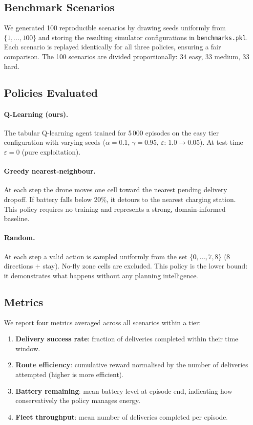 \documentclass[11pt,twocolumn]{article}
\begin{document}
\subsection{Benchmark Scenarios}

We generated 100 reproducible scenarios by drawing seeds uniformly from
$\{1, \ldots, 100\}$ and storing the resulting simulator configurations
in \texttt{benchmarks.pkl}.
Each scenario is replayed identically for all three policies, ensuring a
fair comparison.
The 100 scenarios are divided proportionally: 34 easy, 33 medium, 33
hard.

\subsection{Policies Evaluated}

\paragraph{Q-Learning (ours).}
The tabular Q-learning agent trained for 5\,000 episodes on the easy
tier configuration with varying seeds ($\alpha{=}0.1$,
$\gamma{=}0.95$, $\varepsilon$: $1.0 \to 0.05$).
At test time $\varepsilon = 0$ (pure exploitation).

\paragraph{Greedy nearest-neighbour.}
At each step the drone moves one cell toward the nearest pending
delivery dropoff.
If battery falls below 20\%, it detours to the nearest charging
station.
This policy requires no training and represents a strong,
domain-informed baseline.

\paragraph{Random.}
At each step a valid action is sampled uniformly from the set
$\{0,\ldots,7,8\}$ (8 directions $+$ stay).
No-fly zone cells are excluded.
This policy is the lower bound: it demonstrates what happens without
any planning intelligence.

\subsection{Metrics}

We report four metrics averaged across all scenarios within a tier:

\begin{enumerate}[leftmargin=*, nosep]
    \item \textbf{Delivery success rate}: fraction of deliveries
          completed within their time window.
    \item \textbf{Route efficiency}: cumulative reward normalised by
          the number of deliveries attempted (higher is more efficient).
    \item \textbf{Battery remaining}: mean battery level at episode end,
          indicating how conservatively the policy manages energy.
    \item \textbf{Fleet throughput}: mean number of deliveries completed
          per episode.
\end{enumerate}
\end{document}

